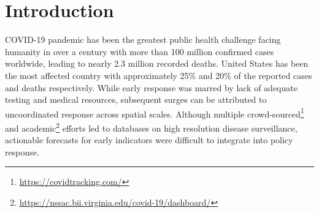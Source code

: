 \documentclass[sigconf]{acmart}
\begin{document}




\maketitle

\section{Introduction}
COVID-19 pandemic has been the greatest public health challenge facing humanity in over a century with more than 100 million confirmed cases worldwide, leading to nearly 2.3 million recorded deaths. United States has been the most affected country with approximately 25\% and 20\% of the reported cases and deaths respectively. While early response was marred by lack of adequate testing and medical resources, subsequent surges can be attributed to uncoordinated response across spatial scales. Although multiple crowd-sourced\footnote{\url{https://covidtracking.com/}} and academic\footnote{\url{https://nssac.bii.virginia.edu/covid-19/dashboard/}} efforts led to databases on high resolution disease surveillance, actionable forecasts for early indicators were difficult to integrate into policy response. 
\end{document}
